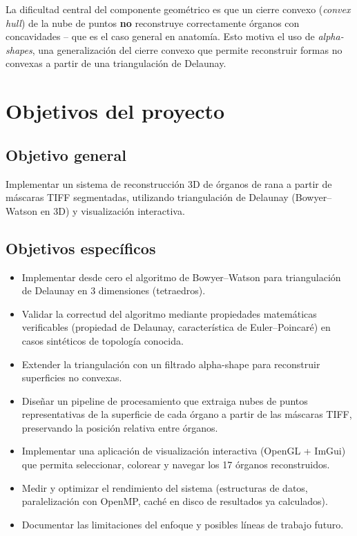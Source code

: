 \documentclass[12pt,a4paper]{article}
\begin{document}
La dificultad central del componente geométrico es que un cierre
convexo (\emph{convex hull}) de la nube de puntos \textbf{no} reconstruye
correctamente órganos con concavidades -- que es el caso general en
anatomía. Esto motiva el uso de \emph{alpha-shapes}, una generalización
del cierre convexo que permite reconstruir formas no convexas a partir
de una triangulación de Delaunay.

\section{Objetivos del proyecto}

\subsection*{Objetivo general}
Implementar un sistema de reconstrucción 3D de órganos de rana a partir
de máscaras TIFF segmentadas, utilizando triangulación de Delaunay
(Bowyer--Watson en 3D) y visualización interactiva.

\subsection*{Objetivos específicos}
\begin{itemize}
    \item Implementar desde cero el algoritmo de Bowyer--Watson para
    triangulación de Delaunay en 3 dimensiones (tetraedros).
    \item Validar la correctud del algoritmo mediante propiedades
    matemáticas verificables (propiedad de Delaunay, característica de
    Euler--Poincaré) en casos sintéticos de topología conocida.
    \item Extender la triangulación con un filtrado alpha-shape para
    reconstruir superficies no convexas.
    \item Diseñar un pipeline de procesamiento que extraiga nubes de
    puntos representativas de la superficie de cada órgano a partir de
    las máscaras TIFF, preservando la posición relativa entre órganos.
    \item Implementar una aplicación de visualización interactiva
    (OpenGL + ImGui) que permita seleccionar, colorear y navegar los 17
    órganos reconstruidos.
    \item Medir y optimizar el rendimiento del sistema (estructuras de
    datos, paralelización con OpenMP, caché en disco de resultados ya
    calculados).
    \item Documentar las limitaciones del enfoque y posibles líneas de
    trabajo futuro.
\end{itemize}
\end{document}
